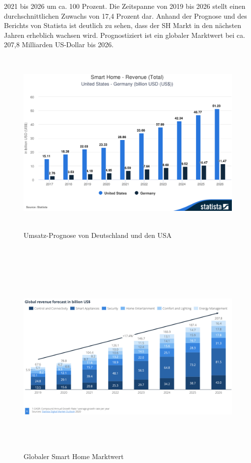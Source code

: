         2021 bis 2026 um ca. 100 Prozent. Die Zeitspanne von 2019 bis 2026 stellt einen durchschnittlichen Zuwachs von 
        17,4 Prozent dar. Anhand der Prognose und des Berichts von Statista ist deutlich zu sehen, dass der \acl{SH} Markt in 
        den nächsten Jahren erheblich wachsen wird. Prognostiziert ist ein globaler Marktwert bei ca. 207,8 Milliarden 
        US-Dollar bis 2026.
        \begin{figure}[hbt!]
            \centering
            \includegraphics[width=15cm,height=9.25cm,keepaspectratio]{images/Statista-Outlook-Smart-Home---Revenue-Total-United-States---Germany-billion-USD-US.png}
            \caption{Umsatz-Prognose von Deutschland und den USA \cite{statista2021}} 
            \label{pic:revenue}
        \end{figure}
        \\
        \begin{figure}[hbt!]
            \centering
            \includegraphics[width=15cm,height=10cm,keepaspectratio]{images/global_Worth_smart-home.png}
            \caption{Globaler Smart Home Marktwert \cite{statista2021}} 
            \label{pic:globalmarket}
        \end{figure}
        \pagebreak 
